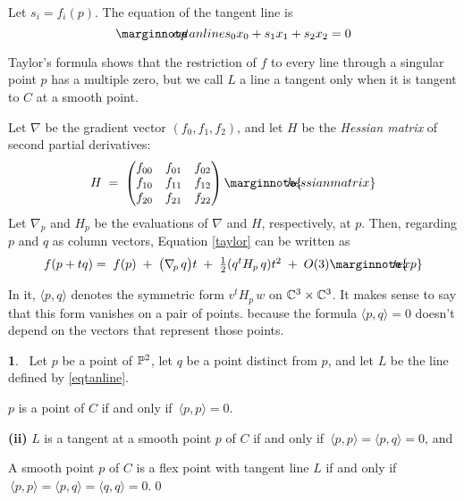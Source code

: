 \documentclass[leqno]{book}
\newcommand\Marginnote[1]{\marginnote{\hspace{-12pt}\normalfont{#1}}}
\theoremstyle{definition}%
\numberwithin{equation}{section}
\theoremstyle{theorem} %
\newtheorem{proposition}[equation]{}
\begin{document}
Let   $s_i = f_i(p)$.  The equation of the tangent line is
\begin{equation}\MMM{eqtanline}\label{eqtanline}
s_0x_0+s_1x_1+s_2x_2 = 0
\end{equation}



  Taylor's formula shows that the restriction of $f$ to
every line through a singular point $p$ has a multiple zero, but we
call $L$ a line a tangent only when it is tangent to $C$ at a smooth
point.

\ms Let $\nabla$ be the gradient vector $(f_0,f_1,f_2)$, and let $H$
be the {\it Hessian matrix} of second partial derivatives:
\begin{equation}
H \;=\; \begin{pmatrix} f_{00}&f_{01}&f_{02}\\
f_{10}&f_{11}&f_{12}\\f_{20}&f_{21}&f_{22}\end{pmatrix}
\Marginnote{hessianmatrix}	\label{hessianmatrix}
\end{equation}
Let $\nabla_p$ and $H_p$ be the evaluations of $\nabla$ and $H$,
respectively, at $p$.  Then, regarding $p$ and $q$ as column vectors,
Equation \ref{taylor} can be written as
\begin{equation}
 f(p+tq) = \;f(p) \;+\; \big( \nablap \,q\big)t \;+ \; \textstyle{\frac 1 2}
(q^tH_p\,q) t^2 \;+\; O(3) \Marginnote{texp}	\label{texp}
\end{equation}


\ms

In it, $\langle p , q \rangle$ denotes the symmetric form $v^tH_p\,w$
on $\mathbb{C}^3\times \mathbb{C}^3$.  It makes sense to say that this form
vanishes on a pair of points. because the formula $\langle
p,q\rangle = 0$ doesn't depend on the vectors that represent those
points.


\begin{proposition}{}\Marginnote{bilinform}\;\,
Let $p$ be a point of $\mathbb{P}^2$, let $q$ be a
point distinct from $p$, and let $L$ be the line defined by
\ref{eqtanline}.

 $p$ is a point of $C$ if and only if $\,\langle p,p\rangle
= 0$.

\no
{\bf (ii)}  $L$  is a tangent at a smooth point $p$ of $C$ if and only if
$\,\langle p,p\rangle =\langle p,q\rangle =0$, and 

 A smooth point $p$ of $C$ is a flex point with tangent
line $L$ if and only if $\,\langle p,p\rangle = \langle p,q\rangle =
\langle q,q\rangle = 0$.\qed \label{bilinform}\end{proposition}
\end{document}
